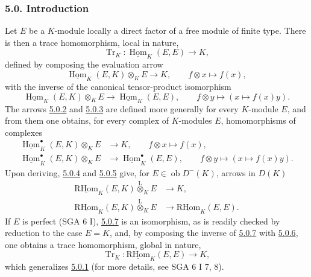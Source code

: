\documentclass[11pt]{article}
\providecommand{\uHom}{\underline{\Hom}}
\providecommand{\uRHom}{\underline{\RHom}}
\DeclareMathOperator{\Hom}{Hom}
\newcommand{\ob}{\operatorname{ob}}
\providecommand{\RHom}{\mathrm{RHom}}
\providecommand{\Tr}{\operatorname{Tr}}
\providecommand{\Tr}{\operatorname{Tr}}
\providecommand{\lten}{\overset{\mathrm L}{\otimes}}
\providecommand{\Tr}{\operatorname{Tr}}
\providecommand{\RHom}{\mathrm{RHom}}
\providecommand{\Hom}{\operatorname{Hom}}
\providecommand{\ob}{\operatorname{ob}}
\providecommand{\lten}{\overset{\mathrm L}{\otimes}}
\providecommand{\RHom}{\mathrm R\mathcal{H}om}
\providecommand{\lten}{\overset{\mathrm L}{\otimes}}
\providecommand{\Tr}{\operatorname{Tr}}
\providecommand{\lten}{\overset{\mathrm L}{\otimes}}
\providecommand{\lten}{\overset{\mathrm L}{\otimes}}
\providecommand{\lten}{\overset{\mathrm L}{\otimes}}
\providecommand{\RHom}{\mathrm{RHom}}
\providecommand{\Hom}{\operatorname{Hom}}
\providecommand{\Tr}{\operatorname{Tr}}
\providecommand{\lten}{\overset{\mathrm L}{\otimes}}
\begin{document}
\subsubsection*{5.0. Introduction}\label{sga5:IIIB:subsubsection:5.0}

Let $E$ be a $K$-module locally a direct factor of a free module of finite type. There is then a trace homomorphism, local in nature,
\begin{equation}\tag{5.0.1}\label{sga5:IIIB:equation:5.0.1}
\Tr_K:\uHom_K(E,E)\longrightarrow K,
\end{equation}
defined by composing the evaluation arrow
\begin{equation}\tag{5.0.2}\label{sga5:IIIB:equation:5.0.2}
\uHom_K(E,K)\otimes_KE\longrightarrow K,\qquad f\otimes x\longmapsto f(x),
\end{equation}
with the inverse of the canonical tensor-product isomorphism
\begin{equation}\tag{5.0.3}\label{sga5:IIIB:equation:5.0.3}
\uHom_K(E,K)\otimes_KE\longrightarrow\uHom_K(E,E),\qquad f\otimes y\longmapsto (x\longmapsto f(x)y).
\end{equation}
The arrows \hyperref[sga5:IIIB:equation:5.0.2]{5.0.2} and \hyperref[sga5:IIIB:equation:5.0.3]{5.0.3} are defined more generally for every $K$-module $E$, and from them one obtains, for every complex of $K$-modules $E$, homomorphisms of complexes
\begin{align}
\uHom_K^\bullet(E,K)\otimes_KE&\longrightarrow K,\qquad f\otimes x\longmapsto f(x),\tag{5.0.4}\label{sga5:IIIB:equation:5.0.4}\\
\uHom_K^\bullet(E,K)\otimes_KE&\longrightarrow \uHom_K^\bullet(E,E),\qquad f\otimes y\longmapsto (x\longmapsto f(x)y).\tag{5.0.5}\label{sga5:IIIB:equation:5.0.5}
\end{align}
Upon deriving, \hyperref[sga5:IIIB:equation:5.0.4]{5.0.4} and \hyperref[sga5:IIIB:equation:5.0.5]{5.0.5} give, for $E\in\ob D^-(K)$, arrows in $D(K)$
\begin{align}
\uRHom_K(E,K)\lten_KE&\longrightarrow K,\tag{5.0.6}\label{sga5:IIIB:equation:5.0.6}\\
\uRHom_K(E,K)\lten_KE&\longrightarrow\uRHom_K(E,E).\tag{5.0.7}\label{sga5:IIIB:equation:5.0.7}
\end{align}
If $E$ is perfect (SGA 6 I), \hyperref[sga5:IIIB:equation:5.0.7]{5.0.7} is an isomorphism, as is readily checked by reduction to the case $E=K$, and, by composing the inverse of \hyperref[sga5:IIIB:equation:5.0.7]{5.0.7} with \hyperref[sga5:IIIB:equation:5.0.6]{5.0.6}, one obtains a trace homomorphism, global in nature,
\begin{equation}\tag{5.0.8}\label{sga5:IIIB:equation:5.0.8}
\Tr_K:\uRHom_K(E,E)\longrightarrow K,
\end{equation}
which generalizes \hyperref[sga5:IIIB:equation:5.0.1]{5.0.1} (for more details, see SGA 6 I 7, 8).
\end{document}
